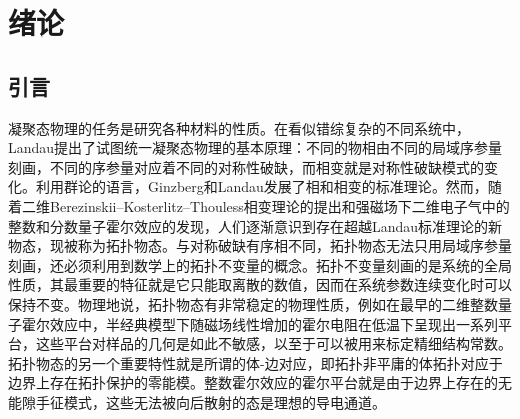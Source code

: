 
\chapter{绪论}
\label{ch1}

\section{引言}

凝聚态物理的任务是研究各种材料的性质。在看似错综复杂的不同系统中，Landau提出了试图统一凝聚态物理的基本原理\cite{Landau:480039}：不同的物相由不同的局域序参量刻画，不同的序参量对应着不同的对称性破缺，而相变就是对称性破缺模式的变化。利用群论的语言，Ginzberg和Landau发展了相和相变的标准理论\cite{Landau:486430}。然而，随着二维Berezinskii–Kosterlitz–Thouless相变理论\cite{Kosterlitz1973}的提出和强磁场下二维电子气中的整数\cite{Klitzing1980}和分数\cite{Tsui1982}量子霍尔效应的发现，人们逐渐意识到存在超越Landau标准理论的新物态，现被称为拓扑物态。与对称破缺有序相不同，拓扑物态无法只用局域序参量刻画，还必须利用到数学上的拓扑不变量的概念。拓扑不变量刻画的是系统的全局性质，其最重要的特征就是它只能取离散的数值，因而在系统参数连续变化时可以保持不变。物理地说，拓扑物态有非常稳定的物理性质，例如在最早的二维整数量子霍尔效应中，半经典模型下随磁场线性增加的霍尔电阻在低温下呈现出一系列平台，这些平台对样品的几何是如此不敏感，以至于可以被用来标定精细结构常数。拓扑物态的另一个重要特性就是所谓的体-边对应，即拓扑非平庸的体拓扑对应于边界上存在拓扑保护的零能模。整数霍尔效应的霍尔平台就是由于边界上存在的无能隙手征模式，这些无法被向后散射的态是理想的导电通道。

